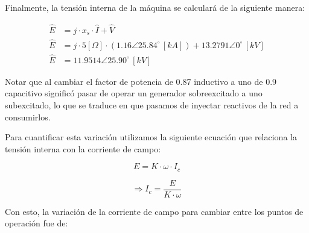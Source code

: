 \documentclass[
  11pt,
  letterpaper,
   addpoints,
   answers
  ]{exam}
\begin{document}
\begin{questions}
\begin{solution}
Finalmente, la tensión interna de la máquina se calculará de la siguiente manera:

\begin{align}
\hat{E} &= j \cdot x_s \cdot \hat{I} + \hat{V} \\
\hat{E} &= j \cdot 5[\Omega] \cdot (1.16 \angle 25.84^\circ \, [kA]) + 13.2791 \angle 0^\circ \, [kV] \\
\hat{E} &= 11.9514 \angle 25.90^\circ \, [kV]
\end{align}

\begin{center}
    \end{center}
    
Notar que al cambiar el factor de potencia de 0.87 inductivo a uno de 0.9 capacitivo significó pasar de operar un generador sobreexcitado a uno subexcitado, lo que se traduce en que pasamos de inyectar reactivos de la red a consumirlos.

Para cuantificar esta variación utilizamos la siguiente ecuación que relaciona la tensión interna con la corriente de campo:

\[
E = K \cdot \omega \cdot I_c
\]

\[
\Rightarrow I_c = \frac{E}{K \cdot \omega}
\]

Con esto, la variación de la corriente de campo para cambiar entre los puntos de operación fue de:


\end{solution}
\end{questions}
\end{document}
